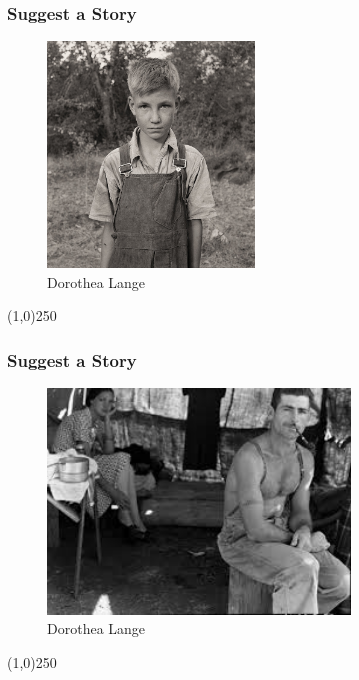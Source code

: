 \begin{frame}
\frametitle{Suggest a Story}
\begin{figure}
	\centering
		\includegraphics[height=6cm]{img/candc/DorethaLange2.jpg}
	\caption{Dorothea Lange}
	\label{fig:DorotheaLange2}
\end{figure}
\end{frame}
\begin{center}\line(1,0){250}\end{center}



\begin{frame}
\frametitle{Suggest a Story}
\begin{figure}
	\centering
		\includegraphics[height=6cm]{img/candc/DorethaLange3.jpg}
	\caption{Dorothea Lange}
	\label{fig:DorotheaLange3}
\end{figure}
\end{frame}
\begin{center}\line(1,0){250}\end{center}





